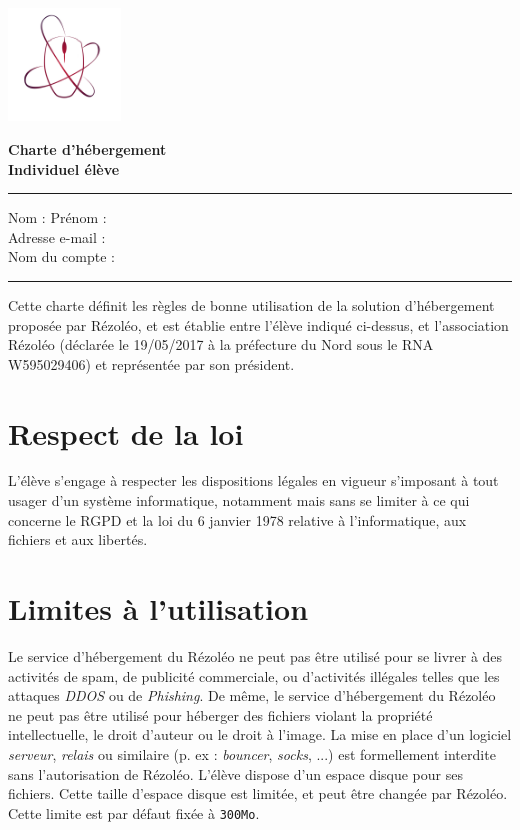 \documentclass[11pt, a4paper]{article}
\begin{document}
\begin{center}
	\begin{minipage}{0.2\textwidth}
		\includegraphics[height=3cm]{rezoleo_logo.png}
	\end{minipage}
	\begin{minipage}{0.7\textwidth}
		\vspace{0.3cm}
		\Huge \textbf{Charte d'hébergement}\\
		\Huge \textbf{Individuel élève}
	\end{minipage}
\end{center}

\vspace*{0.5cm}

\hrule
\vspace{.5cm}
\noindent Nom : \makebox[8cm]{\dotfill}
Prénom : \dotfill
\vspace{.5cm}\\
Adresse e-mail : \dotfill
\vspace{.5cm}\\
Nom du compte : \dotfill\\
\hrule
\vspace{1cm}

\noindent Cette charte définit les règles de bonne utilisation de la solution d'hébergement proposée par Rézoléo, et est établie entre l'élève indiqué ci-dessus, et l'association Rézoléo (déclarée le 19/05/2017 à la préfecture du Nord sous le RNA W595029406) et représentée par son président.

\section{Respect de la loi}
L'élève s'engage à respecter les dispositions légales en vigueur s'imposant à tout usager d'un système informatique, notamment mais sans se limiter à ce qui concerne le RGPD et la loi du 6 janvier 1978 relative à l'informatique, aux fichiers et aux libertés.

\section{Limites à l'utilisation}
Le service d'hébergement du Rézoléo ne peut pas être utilisé pour se livrer à des activités de spam, de publicité commerciale, ou d'activités illégales telles que les attaques \textit{DDOS} ou de \textit{Phishing}. De même, le service d'hébergement du Rézoléo ne peut pas être utilisé pour héberger des fichiers violant la propriété intellectuelle, le droit d'auteur ou le droit à l'image. La mise en place d'un logiciel \textit{serveur}, \textit{relais} ou similaire (p. ex : \textit{bouncer}, \textit{socks}, ...) est formellement interdite sans l'autorisation de Rézoléo.
L'élève dispose d'un espace disque pour ses fichiers. Cette taille d'espace disque est limitée, et peut être changée par Rézoléo. Cette limite est par défaut fixée à \texttt{300Mo}.
\end{document}
